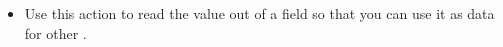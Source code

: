 \begin{itemize}
\item Use this action to read the value out of a field so that you can use it as data for other \gdsteps{}. 
\end{itemize}

